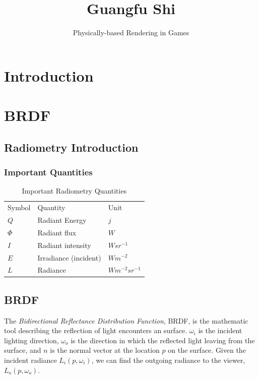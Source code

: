 \documentclass[12pt]{report}
\author{Physically-based Rendering in Games}
\title{Guangfu Shi}
\begin{document}
\chapter{Introduction}

\chapter{BRDF}

\section{Radiometry Introduction}

\subsection{Important Quantities}

\begin{table}[ht]
\begin{center}
	
	\renewcommand{\arraystretch}{1.2}
	\begin{tabular}{ | l | l | l |}     	
	\hline

	Symbol & Quantity & Unit \\
	\cline{1-3}

	\(Q\) 			& 		Radiant Energy 				& 		\(j\) \\
	\(\Phi\) 			& 		Radiant flux 					& 		\(W\) \\
	\(I\) 			& 		Radiant intensity 				& 		\(W sr^{-1}\) \\
	\(E\)			&		Irradiance (incident) 			&		\(W m^{-2}\) \\
	\(L\)			&		Radiance						&		\(W m^{-2} sr^{-1}\) \\
	
	\hline

	\end{tabular}
\end{center}
\caption{Important Radiometry Quantities}
\label{tab:radiometry_quantities}
\end{table} 

\section{BRDF} 

The \emph{Bidirectional Reflectance Distribution Function}, BRDF, is the mathematic tool describing the reflection of light encounters an surface. \(\omega_{i}\) is the incident lighting direction, \(\omega_{o}\) is the direction in which the reflected light leaving from the surface, and \(n\) is the normal vector at the location \(p\) on the surface. Given the incident radiance \(L_{i}(p, \omega_{i})\), we can find the outgoing radiance to the viewer, \(L_{o}(p, \omega_{o})\). 
\end{document}
